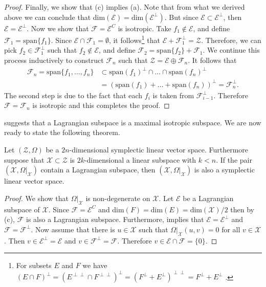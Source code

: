 \begin{proof}
Finally, we show that (c) implies (a). Note that from what we derived above we can conclude that dim$(\mathcal E) = \text{dim}(\mathcal E^{\perp})$. But since $\mathcal E \subset \mathcal E^{\perp}$, then $\mathcal E = \mathcal E^{\perp}$. Now we show that $\mathcal F = \mathcal E^{C}$ is isotropic. Take $f_1 \notin \mathcal E$, and define $\mathcal F_1 = \text{span}\{f_1\}$. Since $\mathcal E \cap \mathcal F_1 = \emptyset$, it follows\footnote{For subsets $E$ and $F$ we have $(E\cap F)^{\perp} = (E^{\perp \perp} \cap F^{\perp \perp})^{\perp} =( F^\perp + E^{\perp})^{\perp \perp} = F^{\perp} + E^\perp$ \cite{abraham1978foundations}.} that $\mathcal E + \mathcal F_1^{\perp} = \mathcal Z$. Therefore, we can pick $f_2\in \mathcal F_1^{\perp}$ such that $f_2\notin \mathcal E$, and define $\mathcal F_2 = \text{span}\{f_2\} + \mathcal F_1$. We continue this process inductively to construct $\mathcal F_n$ such that $\mathcal Z = \mathcal E \oplus \mathcal F_n$. It follows that 
\begin{equation*}
\begin{aligned}
	\mathcal F_n = \text{span}\{f_1,\dots,f_n\} & \subset \text{span}(f_1)^{\perp} \cap \dots \cap \text{span}(f_n)^{\perp} \\
	&= (\text{span}(f_1) + \dots + \text{span}(f_n))^{\perp} =  \mathcal F_n^{\perp}.
\end{aligned}
\end{equation*}
The second step is due to the fact that each $f_i$ is taken from $\mathcal F_{i-1}^{\perp}$. Therefore $\mathcal F = \mathcal F_n$ is isotropic and this completes the proof.
\end{proof}

 suggests that a Lagrangian subspace is a maximal isotropic subspace. We are now ready to state the following theorem.

\begin{theorem} \label{theorem:2.14}
Let $(\mathcal Z, \Omega)$ be a $2n$-dimensional symplectic linear vector space. Furthermore suppose that $\mathcal X\subset \mathcal Z$ is $2k$-dimensional a linear subspace with $k<n$. If the pair $(\mathcal X,\Omega|_{\mathcal X})$ contain a Lagrangian subspace, then $(\mathcal X,\Omega|_{\mathcal X})$ is also a symplectic linear vector space.
\end{theorem}
\begin{proof}
We show that $\Omega|_{\mathcal X}$ is non-degenerate on $\mathcal X$. Let $\mathcal E$ be a Lagrangian subspace of $\mathcal X$. Since $\mathcal F = \mathcal E^{C}$ and dim$(F) = \text{dim}(E) = \text{dim}(\mathcal X)/2$ then by  (c), $\mathcal F$ is also a Lagrangian subspace. Furthermore,  implies that $\mathcal E = \mathcal E^{\perp}$ and $\mathcal F = \mathcal F^{\perp}$. Now assume that there is $u\in\mathcal X$ such that $\Omega|_{\mathcal X}(u,v)=0$ for all $v\in \mathcal X$. Then $v\in \mathcal E^{\perp} = \mathcal E$ and $v\in \mathcal F^{\perp} = \mathcal F$. Therefore $v\in\mathcal E \cap \mathcal F = \{ 0 \}$.
\end{proof}

